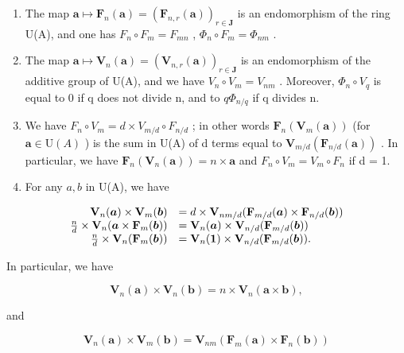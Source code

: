 \begin{enumerate}
\def\labelenumi{\alph{enumi})}
\item
  The map \(\boldsymbol{a} \mapsto \mathbf{F}_{n}(\boldsymbol{a}) = (\mathbf{F}_{n,r}(\boldsymbol{a}))_{r \in \mathbf{J}}\) is an endomorphism of the ring U(A), and one has \(F_{n} \circ F_{m} = F_{mn}\) , \(\Phi_{n} \circ F_{m} = \Phi_{nm}\) .
\item
  The map \(\boldsymbol{a} \mapsto \mathbf{V}_{n}(\boldsymbol{a}) = (\mathbf{V}_{n,r}(\boldsymbol{a}))_{r \in \mathbf{J}}\) is an endomorphism of the additive group of U(A), and we have \(V_{n} \circ V_{m} = V_{nm}\) . Moreover, \(\Phi_{n} \circ V_{q}\) is equal to 0 if q does not divide n, and to \(q\Phi_{n/q}\) if q divides n.
\item
  We have \(F_{n} \circ V_{m} = d \times V_{m/d} \circ F_{n/d}\) ; in other words \(\mathbf{F}_{n}(\mathbf{V}_{m}(\boldsymbol{a}))\) (for \(\boldsymbol{a} \in \mathrm{U}(A)\) ) is the sum in U(A) of d terms equal to \(\mathbf{V}_{m/d}(\mathbf{F}_{n/d}(\boldsymbol{a}))\) . In particular, we have \(\mathbf{F}_{n}(\mathbf{V}_{n}(\boldsymbol{a})) = n \times \boldsymbol{a}\) and \(F_{n} \circ V_{m} = V_{m} \circ F_{n}\) if d = 1.
\item
  For any \(a, b\) in U(A), we have
\end{enumerate}

\[
\begin{array}{r l} \mathbf {V} _ {n} (\boldsymbol {a}) \times \mathbf {V} _ {m} (\boldsymbol {b}) & = d \times \mathbf {V} _ {n m / d} (\mathbf {F} _ {m / d} (\boldsymbol {a}) \times \mathbf {F} _ {n / d} (\boldsymbol {b})) \\ \frac {n}{d} \times \mathbf {V} _ {n} (\boldsymbol {a} \times \mathbf {F} _ {m} (\boldsymbol {b})) & = \mathbf {V} _ {n} (\boldsymbol {a}) \times \mathbf {V} _ {n / d} (\mathbf {F} _ {m / d} (\boldsymbol {b})) \\ \frac {n}{d} \times \mathbf {V} _ {n} (\mathbf {F} _ {m} (\boldsymbol {b})) & = \mathbf {V} _ {n} (\mathbf {1}) \times \mathbf {V} _ {n / d} (\mathbf {F} _ {m / d} (\boldsymbol {b}))  . \end{array}
\]

In particular, we have

\[
\mathbf {V} _ {n} (\boldsymbol {a}) \times \mathbf {V} _ {n} (\boldsymbol {b}) = n \times \mathbf {V} _ {n} (\boldsymbol {a} \times \boldsymbol {b}),
\]

and

\[
\mathbf {V} _ {n} (\boldsymbol {a}) \times \mathbf {V} _ {m} (\boldsymbol {b}) = \mathbf {V} _ {n m} (\mathbf {F} _ {m} (\boldsymbol {a}) \times \mathbf {F} _ {n} (\boldsymbol {b}))
\]

